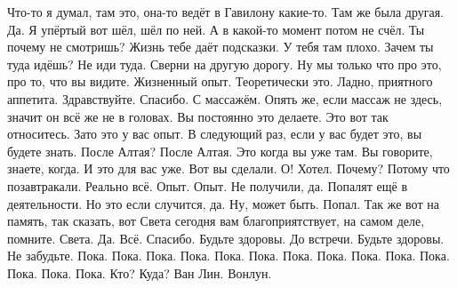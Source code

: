 Что-то я думал, там это, она-то ведёт в Гавилону какие-то.
Там же была другая.
Да.
Я упёртый вот шёл, шёл по ней.
А в какой-то момент потом не счёл.
Ты почему не смотришь?
Жизнь тебе даёт подсказки.
У тебя там плохо.
Зачем ты туда идёшь?
Не иди туда.
Сверни на другую дорогу.
Ну мы только что про это, про то, что вы видите.
Жизненный опыт.
Теоретически это.
Ладно, приятного аппетита.
Здравствуйте.
Спасибо.
С массажём.
Опять же, если массаж не здесь, значит он всё же не в головах.
Вы постоянно это делаете.
Это вот так относитесь.
Зато это у вас опыт.
В следующий раз, если у вас будет это, вы будете знать.
После Алтая?
После Алтая.
Это когда вы уже там.
Вы говорите, знаете, когда.
И это для вас уже.
Вот вы сделали.
О!
Хотел.
Почему?
Потому что позавтракали.
Реально всё.
Опыт.
Опыт.
Не получили, да.
Попалят ещё в деятельности.
Но это если случится, да.
Ну, может быть.
Попал.
Так же вот на память, так сказать, вот Света сегодня
вам благоприятствует, на самом деле, помните.
Света.
Да.
Всё.
Спасибо.
Будьте здоровы.
До встречи.
Будьте здоровы.
Не забудьте.
Пока.
Пока.
Пока.
Пока.
Пока.
Пока.
Пока.
Пока.
Пока.
Пока.
Пока.
Пока.
Пока.
Пока.
Кто?
Куда?
Ван Лин.
Вонлун.
